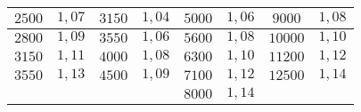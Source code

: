 \begin{table}[]
\begin{tabular}{|c|c|c|c|c|c|c|c|}
$2500$        & $1,07$        & $3150$        & $1,04$       & $5000$        & $1,06$       & $9000$        & $1,08$       \\ \hline
$2800$        & $1,09$        & $3550$        & $1,06$       & $5600$        & $1,08$       & $10000$       & $1,10$       \\ \hline
$3150$        & $1,11$        & $4000$        & $1,08$       & $6300$        & $1,10$       & $11200$       & $1,12$       \\ \hline
$3550$        & $1,13$        & $4500$        & $1,09$       & $7100$        & $1,12$       & $12500$       & $1,14$       \\ \hline
              &               &               &              & $8000$        & $1,14$       &               &              \\ \hline
\end{tabular}
\end{table}